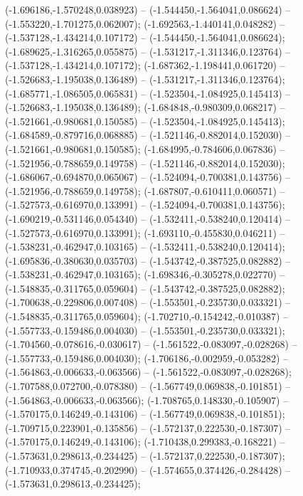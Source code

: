  (-1.696186,-1.570248,0.038923) -- (-1.544450,-1.564041,0.086624) -- (-1.553220,-1.701275,0.062007);
 (-1.692563,-1.440141,0.048282) -- (-1.537128,-1.434214,0.107172) -- (-1.544450,-1.564041,0.086624);
 (-1.689625,-1.316265,0.055875) -- (-1.531217,-1.311346,0.123764) -- (-1.537128,-1.434214,0.107172);
 (-1.687362,-1.198441,0.061720) -- (-1.526683,-1.195038,0.136489) -- (-1.531217,-1.311346,0.123764);
 (-1.685771,-1.086505,0.065831) -- (-1.523504,-1.084925,0.145413) -- (-1.526683,-1.195038,0.136489);
 (-1.684848,-0.980309,0.068217) -- (-1.521661,-0.980681,0.150585) -- (-1.523504,-1.084925,0.145413);
 (-1.684589,-0.879716,0.068885) -- (-1.521146,-0.882014,0.152030) -- (-1.521661,-0.980681,0.150585);
 (-1.684995,-0.784606,0.067836) -- (-1.521956,-0.788659,0.149758) -- (-1.521146,-0.882014,0.152030);
 (-1.686067,-0.694870,0.065067) -- (-1.524094,-0.700381,0.143756) -- (-1.521956,-0.788659,0.149758);
 (-1.687807,-0.610411,0.060571) -- (-1.527573,-0.616970,0.133991) -- (-1.524094,-0.700381,0.143756);
 (-1.690219,-0.531146,0.054340) -- (-1.532411,-0.538240,0.120414) -- (-1.527573,-0.616970,0.133991);
 (-1.693110,-0.455830,0.046211) -- (-1.538231,-0.462947,0.103165) -- (-1.532411,-0.538240,0.120414);
 (-1.695836,-0.380630,0.035703) -- (-1.543742,-0.387525,0.082882) -- (-1.538231,-0.462947,0.103165);
 (-1.698346,-0.305278,0.022770) -- (-1.548835,-0.311765,0.059604) -- (-1.543742,-0.387525,0.082882);
 (-1.700638,-0.229806,0.007408) -- (-1.553501,-0.235730,0.033321) -- (-1.548835,-0.311765,0.059604);
 (-1.702710,-0.154242,-0.010387) -- (-1.557733,-0.159486,0.004030) -- (-1.553501,-0.235730,0.033321);
 (-1.704560,-0.078616,-0.030617) -- (-1.561522,-0.083097,-0.028268) -- (-1.557733,-0.159486,0.004030);
 (-1.706186,-0.002959,-0.053282) -- (-1.564863,-0.006633,-0.063566) -- (-1.561522,-0.083097,-0.028268);
 (-1.707588,0.072700,-0.078380) -- (-1.567749,0.069838,-0.101851) -- (-1.564863,-0.006633,-0.063566);
 (-1.708765,0.148330,-0.105907) -- (-1.570175,0.146249,-0.143106) -- (-1.567749,0.069838,-0.101851);
 (-1.709715,0.223901,-0.135856) -- (-1.572137,0.222530,-0.187307) -- (-1.570175,0.146249,-0.143106);
 (-1.710438,0.299383,-0.168221) -- (-1.573631,0.298613,-0.234425) -- (-1.572137,0.222530,-0.187307);
 (-1.710933,0.374745,-0.202990) -- (-1.574655,0.374426,-0.284428) -- (-1.573631,0.298613,-0.234425);

